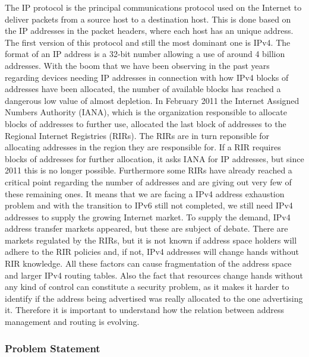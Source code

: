 \documentclass[11pt,a4paper]{scrreprt}
\begin{document}
The IP protocol is the principal communications protocol used on the Internet to deliver packets from a source host to a destination host. This is done based on the IP addresses in the packet headers, where each host has an unique address. 
The first version of this protocol and still the most dominant one is IPv4. The format of an IP address is a 32-bit number allowing a use of around 4 billion addresses. With the boom that we have been observing in the past years regarding devices needing IP addresses in connection with how IPv4 blocks of addresses have been allocated, the number of available blocks has reached a dangerous low value of almost depletion.      
In February 2011 the Internet Assigned Numbers Authority (IANA), which is the organization responsible to allocate blocks of addresses to further use, allocated the last block of addresses to the Regional Internet Registries (RIRs). The RIRs are in turn reponsible for allocating addresses in the region they are responsible for. If a RIR requires blocks of addresses for further allocation, it asks IANA for IP addresses, but since 2011 this is no longer possible. Furthermore some RIRs have already reached a critical point regarding the number of addresses and are giving out very few of these remaining ones. It means that we are facing a IPv4 address exhaustion problem and with the transition to IPv6 still not completed, we still need IPv4 addresses to supply the growing Internet market. To supply the demand, IPv4 address transfer markets appeared, but these are subject of debate. There are markets regulated by the RIRs, but it is not known if address space holders will adhere to the RIR policies and, if not, IPv4 addresses will change hands without RIR knowledge.
All these factors can cause fragmentation of the address space and larger IPv4 routing tables. Also the fact that resources change hands without any kind of control can constitute a security problem, as it makes it harder to identify if the address being advertised was really allocated to the one advertising it. 
Therefore it is important to understand how the relation between address management and routing is evolving. 

\subsubsection{Problem Statement}
\end{document}
